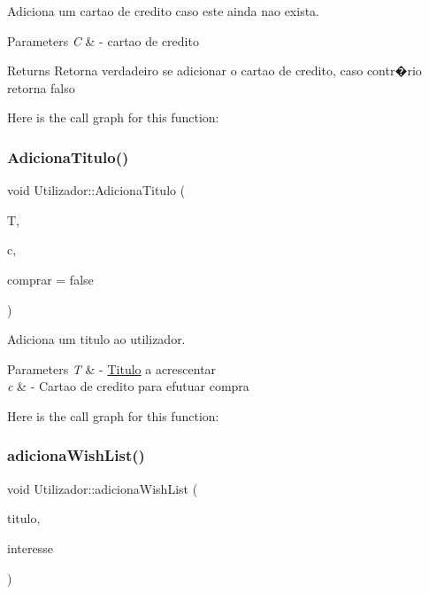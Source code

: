 Adiciona um cartao de credito caso este ainda nao exista. 


\begin{DoxyParams}{Parameters}
{\em C} & -\/ cartao de credito \\
\hline
\end{DoxyParams}
\begin{DoxyReturn}{Returns}
Retorna verdadeiro se adicionar o cartao de credito, caso contr�rio retorna falso 
\end{DoxyReturn}
Here is the call graph for this function\+:
\mbox{\label{class_utilizador_ac08a744b9d9d2aca0bd22c60e0beaa83}} 
\subsubsection{\texorpdfstring{Adiciona\+Titulo()}{AdicionaTitulo()}}
{\footnotesize\ttfamily void Utilizador\+::\+Adiciona\+Titulo (\begin{DoxyParamCaption}\item[{\mbox{\hyperlink{class_titulo}{Titulo}} $\ast$}]{T,  }\item[{\mbox{\hyperlink{class_cartao_credito}{Cartao\+Credito}} \&}]{c,  }\item[{bool}]{comprar = {\ttfamily false} }\end{DoxyParamCaption})}



Adiciona um titulo ao utilizador. 


\begin{DoxyParams}{Parameters}
{\em T} & -\/ \mbox{\hyperlink{class_titulo}{Titulo}} a acrescentar \\
\hline
{\em c} & -\/ Cartao de credito para efutuar compra \\
\hline
\end{DoxyParams}
Here is the call graph for this function\+:
\mbox{\label{class_utilizador_a45ee0a8d988adbd537e2506d80f96cfb}} 
\subsubsection{\texorpdfstring{adiciona\+Wish\+List()}{adicionaWishList()}}
{\footnotesize\ttfamily void Utilizador\+::adiciona\+Wish\+List (\begin{DoxyParamCaption}\item[{\mbox{\hyperlink{class_titulo}{Titulo}} $\ast$}]{titulo,  }\item[{unsigned}]{interesse }\end{DoxyParamCaption})}

